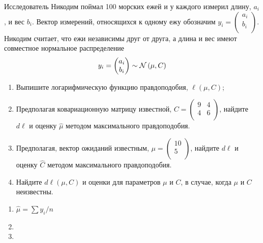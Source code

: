 \begin{problem}
Исследователь Никодим поймал 100 морских ежей и у каждого измерил длину, $a_i$,
и вес $b_i$. Вектор измерений, относящихся к одному ежу обозначим $y_i = \begin{pmatrix}
a_i \\
b_i \\
\end{pmatrix}$. Никодим считает, что ежи независимы друг от друга,
а длина и вес имеют совместное нормальное распределение
\[
y_i = \begin{pmatrix}
a_i \\
b_i \\
\end{pmatrix} \sim \mathcal{N} \left( \mu, C  \right)
\]

\begin{enumerate}
\item Выпишите логарифмическую функцию правдоподобия, $\ell(\mu, C)$;
\item Предполагая ковариационную матрицу известной, $C = \begin{pmatrix}
9 & 4 \\
4 & 6 \\
\end{pmatrix}$,
найдите $d \ell$ и оценку $\hat \mu$ методом максимального правдоподобия.

\item Предполагая, вектор ожиданий известным, $\mu = \begin{pmatrix}
10 \\
5 \\
\end{pmatrix}$,
 найдите $d \ell$ и оценку $\hat C$ методом максимального правдоподобия.


\item Найдите $d \ell(\mu, C)$ и оценки для параметров $\mu$ и $C$,
в случае, когда $\mu$ и $C$ неизвестны.
\end{enumerate}


\begin{sol}
\begin{enumerate}
\item $\hat \mu  = \sum y_i / n$
\item
\item
\end{enumerate}
\end{sol}
\end{problem}




\section{}


